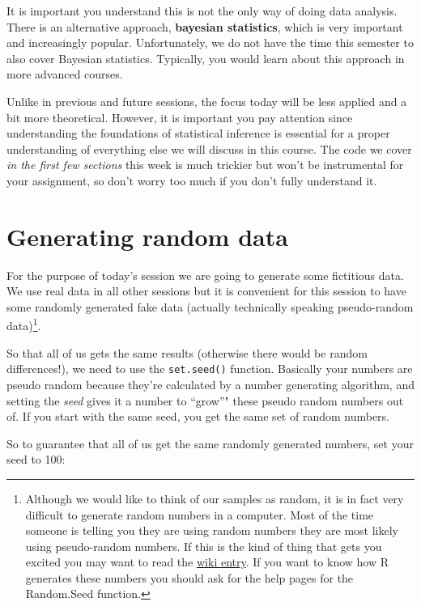 \documentclass[
]{book}
\begin{document}
It is important you understand this is not the only way of doing data analysis. There is an alternative approach, \textbf{bayesian statistics}, which is very important and increasingly popular. Unfortunately, we do not have the time this semester to also cover Bayesian statistics. Typically, you would learn about this approach in more advanced courses.

Unlike in previous and future sessions, the focus today will be less applied and a bit more theoretical. However, it is important you pay attention since understanding the foundations of statistical inference is essential for a proper understanding of everything else we will discuss in this course. The code we cover \emph{in the first few sections} this week is much trickier but won't be instrumental for your assignment, so don't worry too much if you don't fully understand it.

\hypertarget{generating-random-data}{%
\section{Generating random data}\label{generating-random-data}}

For the purpose of today's session we are going to generate some fictitious data. We use real data in all other sessions but it is convenient for this session to have some randomly generated fake data (actually technically speaking pseudo-random data)\footnote{Although we would like to think of our samples as random, it is in fact very difficult to generate random numbers in a computer. Most of the time someone is telling you they are using random numbers they are most likely using pseudo-random numbers. If this is the kind of thing that gets you excited you may want to read the \href{http://en.wikipedia.org/wiki/Random_number_generation\#.22True.22_random_numbers_vs._pseudo-random_numbers}{wiki entry}. If you want to know how R generates these numbers you should ask for the help pages for the Random.Seed function.}.

So that all of us gets the same results (otherwise there would be random differences!), we need to use the \texttt{set.seed()} function. Basically your numbers are pseudo random because they're calculated by a number generating algorithm, and setting the \emph{seed} gives it a number to ``grow''" these pseudo random numbers out of. If you start with the same seed, you get the same set of random numbers.

So to guarantee that all of us get the same randomly generated numbers, set your seed to 100:
\end{document}
